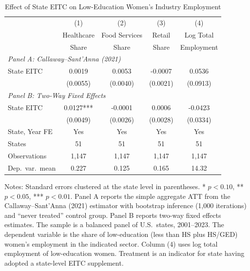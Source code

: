 \begin{table}[H]
\centering
\caption{Effect of State EITC on Low-Education Women's Industry Employment}
\label{tab:main}
\begin{threeparttable}
\begin{tabular}{lcccc}
\toprule
& (1) & (2) & (3) & (4) \\
& Healthcare & Food Services & Retail & Log Total \\
& Share & Share & Share & Employment \\
\midrule
\multicolumn{5}{l}{\textit{Panel A: Callaway--Sant'Anna (2021)}} \\[3pt]
State EITC & 0.0019 & 0.0053 & -0.0007 & 0.0536 \\
& (0.0055) & (0.0040) & (0.0021) & (0.0913) \\[6pt]
\multicolumn{5}{l}{\textit{Panel B: Two-Way Fixed Effects}} \\[3pt]
State EITC & 0.0127*** & -0.0001 & 0.0006 & -0.0423 \\
& (0.0049) & (0.0026) & (0.0028) & (0.0334) \\[6pt]
\midrule
State, Year FE & Yes & Yes & Yes & Yes \\
States & 51 & 51 & 51 & 51 \\
Observations & 1,147 & 1,147 & 1,147 & 1,147 \\
Dep.\ var.\ mean & 0.227 & 0.125 & 0.165 & 14.32 \\
\bottomrule
\end{tabular}
\begin{tablenotes}[flushleft]
\small
\item Notes: Standard errors clustered at the state level in parentheses. * $p<0.10$, ** $p<0.05$, *** $p<0.01$. Panel A reports the simple aggregate ATT from the Callaway--Sant'Anna (2021) estimator with bootstrap inference (1,000 iterations) and ``never treated'' control group. Panel B reports two-way fixed effects estimates. The sample is a balanced panel of U.S.\ states, 2001--2023. The dependent variable is the share of low-education (less than HS plus HS/GED) women's employment in the indicated sector. Column (4) uses log total employment of low-education women. Treatment is an indicator for state having adopted a state-level EITC supplement.
\end{tablenotes}
\end{threeparttable}
\end{table}
